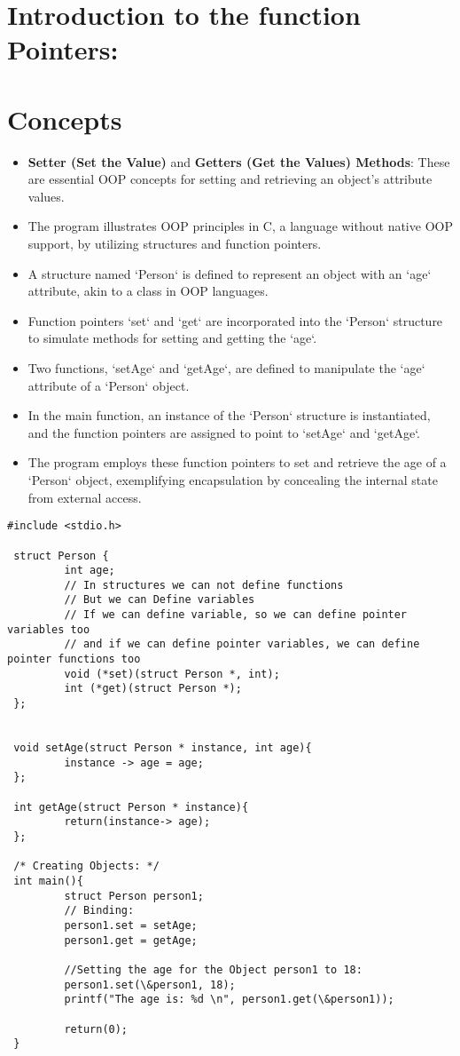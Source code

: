 \section{Introduction to the function Pointers:}






\section{Concepts}
\begin{itemize}
    \item \textbf{Setter (Set the Value)} and \textbf{Getters (Get the Values) Methods}: These are essential OOP concepts for setting and retrieving an object's attribute values.
    \item The program illustrates OOP principles in C, a language without native OOP support, by utilizing structures and function pointers.
    \item A structure named `Person` is defined to represent an object with an `age` attribute, akin to a class in OOP languages.
    \item Function pointers `set` and `get` are incorporated into the `Person` structure to simulate methods for setting and getting the `age`.
    \item Two functions, `setAge` and `getAge`, are defined to manipulate the `age` attribute of a `Person` object.
    \item In the main function, an instance of the `Person` structure is instantiated, and the function pointers are assigned to point to `setAge` and `getAge`.
    \item The program employs these function pointers to set and retrieve the age of a `Person` object, exemplifying encapsulation by concealing the internal state from external access.
\end{itemize}
\break

\begin{lstlisting}
#include <stdio.h>

 struct Person {
         int age;
         // In structures we can not define functions
         // But we can Define variables
         // If we can define variable, so we can define pointer variables too
         // and if we can define pointer variables, we can define pointer functions too
         void (*set)(struct Person *, int);
         int (*get)(struct Person *);
 };


 void setAge(struct Person * instance, int age){
         instance -> age = age;
 };

 int getAge(struct Person * instance){
         return(instance-> age);
 };

 /* Creating Objects: */
 int main(){
         struct Person person1;
         // Binding:
         person1.set = setAge;
         person1.get = getAge;

         //Setting the age for the Object person1 to 18:
         person1.set(\&person1, 18);
         printf("The age is: %d \n", person1.get(\&person1));

         return(0);
 }

\end{lstlisting}
